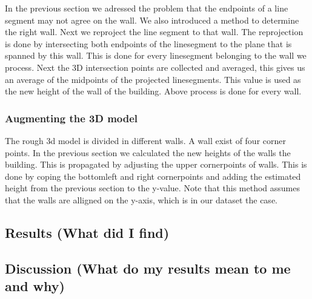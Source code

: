 	In the previous section we adressed the problem that the endpoints of a line segment may not agree on the wall.
	We also introduced a method to determine the right wall.  
	Next we reproject the line segment to that wall.
	The reprojection is done by intersecting both endpoints of the linesegment to the plane that is spanned by this wall.
	This is done for every linesegment belonging to the wall we process. 
	Next the 3D intersection points are collected and averaged, this gives us an average of the midpoints of the projected linesegments.
	This value is used as the new height of the wall of the building.
	Above process is done for every wall.
	

\subsubsection{Augmenting the 3D model} %



	The rough 3d model is divided in different walls. A wall exist of four corner points. In the previous section we calculated the new heights of the walls the building. This is propagated by adjusting the upper cornerpoints of walls.
	This is done by coping the bottomleft and right cornerpoints and adding the estimated height from the previous section to the y-value.
	Note that this method assumes that the walls are alligned on the y-axis, which is in our dataset the case.


\subsection{Results (What did I find)}
\subsection{Discussion (What do my results mean to me and why)}
